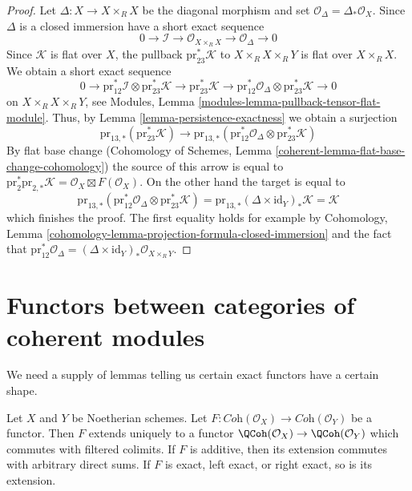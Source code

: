 \begin{proof}
Let $\Delta : X \to X \times_R X$ be the diagonal morphism and
set $\mathcal{O}_\Delta = \Delta_*\mathcal{O}_X$.
Since $\Delta$ is a closed immersion have a short exact sequence
$$
0 \to \mathcal{I} \to 
\mathcal{O}_{X \times_R X} \to \mathcal{O}_\Delta \to 0
$$
Since $\mathcal{K}$ is flat over $X$, the pullback
$\text{pr}_{23}^*\mathcal{K}$ to $X \times_R X \times_R Y$
is flat over $X \times_R X$. We obtain a short exact sequence
$$
0 \to 
\text{pr}_{12}^*\mathcal{I}
\otimes
\text{pr}_{23}^*\mathcal{K} \to
\text{pr}_{23}^*\mathcal{K} \to
\text{pr}_{12}^*\mathcal{O}_\Delta
\otimes
\text{pr}_{23}^*\mathcal{K} \to 0
$$
on $X \times_R X \times_R Y$, see
Modules, Lemma \ref{modules-lemma-pullback-tensor-flat-module}.
Thus, by Lemma \ref{lemma-persistence-exactness}
we obtain a surjection
$$
\text{pr}_{13, *}(\text{pr}_{23}^*\mathcal{K})
\to
\text{pr}_{13, *}(
\text{pr}_{12}^*\mathcal{O}_\Delta
\otimes
\text{pr}_{23}^*\mathcal{K})
$$
By flat base change
(Cohomology of Schemes, Lemma \ref{coherent-lemma-flat-base-change-cohomology})
the source of this arrow is equal to $\text{pr}_2^*\text{pr}_{2, *}\mathcal{K}
= \mathcal{O}_X \boxtimes F(\mathcal{O}_X)$. On the other hand the target is
equal to
$$
\text{pr}_{13, *}(
\text{pr}_{12}^*\mathcal{O}_\Delta
\otimes
\text{pr}_{23}^*\mathcal{K}) =
\text{pr}_{13, *} (\Delta \times \text{id}_Y)_* \mathcal{K} =
\mathcal{K}
$$
which finishes the proof. The first equality holds for example by
Cohomology, Lemma \ref{cohomology-lemma-projection-formula-closed-immersion}
and the fact that $\text{pr}_{12}^*\mathcal{O}_\Delta =
(\Delta \times \text{id}_Y)_*\mathcal{O}_{X \times_R Y}$.
\end{proof}










\section{Functors between categories of coherent modules}
\label{section-functor-coherent}


\noindent
We need a supply of lemmas telling us certain exact functors have
a certain shape.

\begin{lemma}
\label{lemma-functor-coherent}
Let $X$ and $Y$ be Noetherian schemes. Let
$F : \textit{Coh}(\mathcal{O}_X) \to \textit{Coh}(\mathcal{O}_Y)$
be a functor. Then $F$ extends uniquely to a functor
$\QCoh(\mathcal{O}_X) \to \QCoh(\mathcal{O}_Y)$
which commutes with filtered colimits.
If $F$ is additive, then its extension commutes with arbitrary direct sums.
If $F$ is exact, left exact, or right exact, so is its extension.
\end{lemma}

